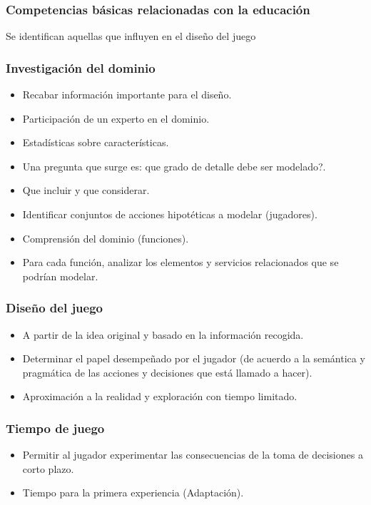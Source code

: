 \subsubsection{Competencias básicas relacionadas con la educación} 

Se identifican aquellas que influyen en el diseño del juego

\subsubsection{Investigación del dominio}
\begin{itemize}
	\item Recabar información importante para el diseño.
	\item Participación de un experto en el dominio.
	\item Estadísticas sobre características.
	\item Una pregunta que surge es: que grado de detalle debe ser modelado?.
	\item Que incluir y que considerar.
	\item Identificar conjuntos de acciones hipotéticas a modelar (jugadores).
	\item Comprensión del dominio (funciones).
	\item Para cada función, analizar los elementos y servicios relacionados que se podrían modelar.
\end{itemize}

\subsubsection{Diseño del juego}
\begin{itemize}
	\item A partir de la idea original y basado en la información recogida. 
	\item Determinar el papel desempeñado por el jugador (de acuerdo a la semántica y pragmática de las acciones y decisiones que está llamado a hacer). 
	\item Aproximación a la realidad y exploración con tiempo limitado. 
\end{itemize}

\subsubsection{Tiempo de juego}
\begin{itemize}
	\item Permitir al jugador experimentar las consecuencias de la toma de decisiones a corto plazo.
	\item Tiempo para la primera experiencia (Adaptación).
\end{itemize}

